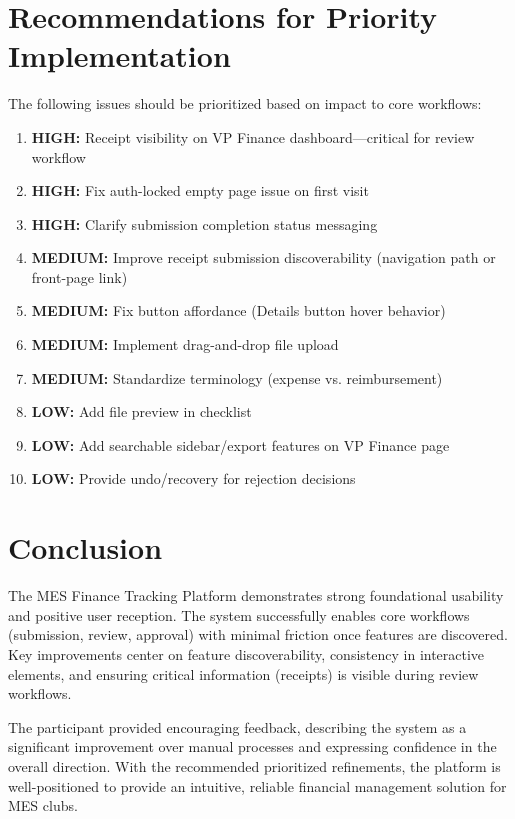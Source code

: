 \documentclass[12pt, titlepage]{article}
\begin{document}
\section{Recommendations for Priority Implementation}

The following issues should be prioritized based on impact to core workflows:

\begin{enumerate}
    \item \textbf{HIGH:} Receipt visibility on VP Finance dashboard—critical for review workflow
    \item \textbf{HIGH:} Fix auth-locked empty page issue on first visit
    \item \textbf{HIGH:} Clarify submission completion status messaging
    \item \textbf{MEDIUM:} Improve receipt submission discoverability (navigation path or front-page link)
    \item \textbf{MEDIUM:} Fix button affordance (Details button hover behavior)
    \item \textbf{MEDIUM:} Implement drag-and-drop file upload
    \item \textbf{MEDIUM:} Standardize terminology (expense vs. reimbursement)
    \item \textbf{LOW:} Add file preview in checklist
    \item \textbf{LOW:} Add searchable sidebar/export features on VP Finance page
    \item \textbf{LOW:} Provide undo/recovery for rejection decisions
\end{enumerate}

\section{Conclusion}

The MES Finance Tracking Platform demonstrates strong foundational usability and positive user reception. The system successfully enables core workflows (submission, review, approval) with minimal friction once features are discovered. Key improvements center on feature discoverability, consistency in interactive elements, and ensuring critical information (receipts) is visible during review workflows.

The participant provided encouraging feedback, describing the system as a significant improvement over manual processes and expressing confidence in the overall direction. With the recommended prioritized refinements, the platform is well-positioned to provide an intuitive, reliable financial management solution for MES clubs.
\end{document}

